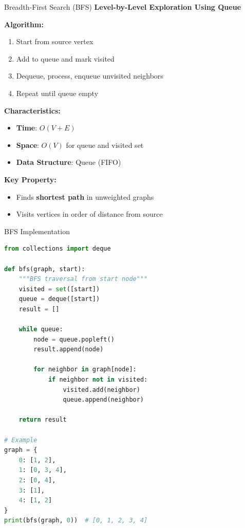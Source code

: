 \documentclass[aspectratio=169]{beamer}
\begin{document}
\begin{frame}{Breadth-First Search (BFS)}
  \textbf{Level-by-Level Exploration Using Queue}

  \vspace{0.3cm}
  \textbf{Algorithm:}
  \begin{enumerate}
    \item Start from source vertex
    \item Add to queue and mark visited
    \item Dequeue, process, enqueue unvisited neighbors
    \item Repeat until queue empty
  \end{enumerate}

  \vspace{0.3cm}
  \textbf{Characteristics:}
  \begin{itemize}
    \item \textbf{Time}: $O(V + E)$
    \item \textbf{Space}: $O(V)$ for queue and visited set
    \item \textbf{Data Structure}: Queue (FIFO)
  \end{itemize}

  \vspace{0.3cm}
  \textbf{Key Property:}
  \begin{itemize}
    \item Finds \textbf{shortest path} in unweighted graphs
    \item Visits vertices in order of distance from source
  \end{itemize}
\end{frame}

\begin{frame}[fragile]{BFS Implementation}
\begin{lstlisting}[language=Python, basicstyle=\ttfamily\tiny]
from collections import deque

def bfs(graph, start):
    """BFS traversal from start node"""
    visited = set([start])
    queue = deque([start])
    result = []

    while queue:
        node = queue.popleft()
        result.append(node)

        for neighbor in graph[node]:
            if neighbor not in visited:
                visited.add(neighbor)
                queue.append(neighbor)

    return result

# Example
graph = {
    0: [1, 2],
    1: [0, 3, 4],
    2: [0, 4],
    3: [1],
    4: [1, 2]
}
print(bfs(graph, 0))  # [0, 1, 2, 3, 4]
\end{lstlisting}
\end{frame}
\end{document}
